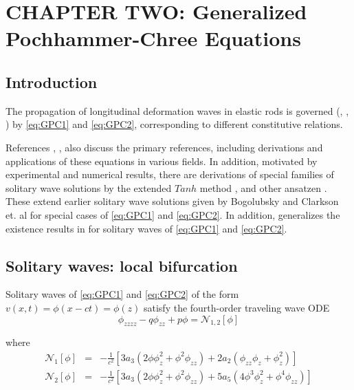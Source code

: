 \chapter{CHAPTER TWO: Generalized Pochhammer-Chree Equations} \label{chapter_2}

\section{Introduction}

The propagation of longitudinal deformation waves in elastic rods is governed
(\cite{LCZ}, \cite{Runz}, \cite{WM}) by 
\eqref{eq:GPC1} and \eqref{eq:GPC2},
corresponding to different constitutive relations.

References \cite{LCZ}, \cite{Runz}, \cite{WM} also discuss the primary
references, including derivations and applications of these equations in
various fields. In addition, motivated by experimental and numerical results,
there are derivations of special families of solitary wave solutions by the
extended $Tanh$ method \cite{LCZ}, and other ansatzen \cite{WM}. These extend
earlier solitary wave solutions given by Bogolubsky \cite{Bogo} and Clarkson
et. al \cite{CLVS} for special cases of \eqref{eq:GPC1} and \eqref{eq:GPC2}. In
addition, \cite{Runz} generalizes the existence results in \cite{Sax} for
solitary waves of \eqref{eq:GPC1} and \eqref{eq:GPC2}.  

\section{Solitary waves: local bifurcation}

Solitary waves of \eqref{eq:GPC1} and \eqref{eq:GPC2} of the form 
$v(x,t) = \phi\left(x - c t\right) = \phi\left(z\right)$
 satisfy the fourth-order traveling wave ODE
\begin{equation} \label{eq:ode} \phi_{zzzz} - q \phi_{zz} + p \phi = \mathcal{N}_{1,2}[\phi]
\end{equation}

where 
\begin{subequations}
\begin{eqnarray}
\mathcal{N}_1\left[\phi\right] &=& - \frac{1}{c^2}\left[  3 a_3 \left( 2 \phi \phi_z^2 + \phi^2 \phi_{zz} \right) + 2 a_2\left( \phi_{zz} \phi_z + \phi_z^2\right) \right] \\
\mathcal{N}_2\left[\phi\right] &=& - \frac{1}{c^2}\left[ 3 a_3 \left( 2 \phi \phi_z^2 + \phi^2 \phi_{zz}\right) + 5 a_5 \left( 4 \phi^3 \phi_z^2 + \phi^4 \phi_{zz} \right) \right]
\end{eqnarray}
\end{subequations}


